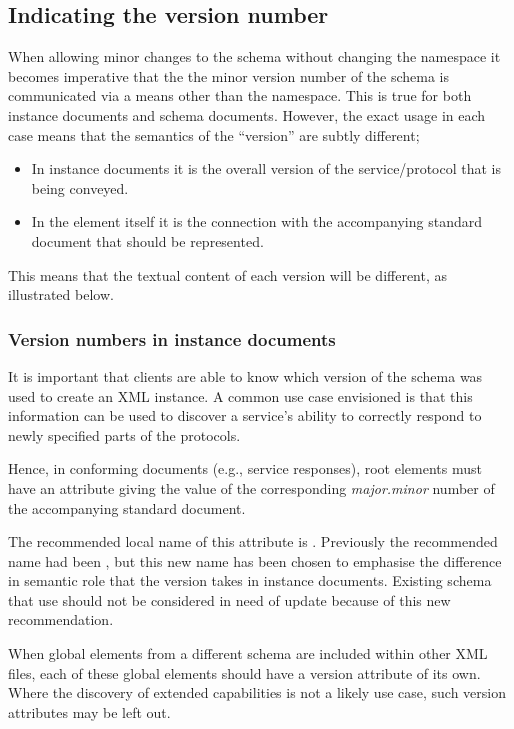 \documentclass[10pt,a4paper]{ivoa}
\begin{document}
\subsection{Indicating the version number}

When allowing minor changes to the schema without changing the
namespace it becomes imperative that the the minor version number of the schema
is communicated via a means other than the namespace.  This is true for
both instance documents and schema documents. However, the exact usage in each
case means that the semantics of the ``version'' are subtly different;
\begin{itemize}
  \item In instance documents it is the overall version of the service/protocol
  that is being conveyed.
  \item In the  element itself it is the connection with the
  accompanying standard document that should be represented.
\end{itemize}

This means that the textual content of each version will be different, as
illustrated below.

\subsubsection{Version numbers in instance documents}

It is important that
clients are able to know which version of the schema was used to create an XML
instance.  A common use case envisioned is that
this information can be used to discover a service's ability to
correctly respond to newly specified parts of the protocols.

Hence, in conforming documents (e.g., service responses),
root elements must have an
attribute giving the value of the corresponding \textit{major.minor} number of the
accompanying standard document.

The recommended local name of this attribute is
. Previously the recommended name had been ,
but this new name has been chosen to emphasise the difference in semantic role
that the version takes in instance documents. Existing schema that use
 should not be considered in need of update because of this new
recommendation.

When global elements from a different schema are included within other
XML files, each of these global elements should have a version attribute
of its own.  Where the discovery of extended capabilities is not a
likely use case, such version attributes may be left out.
\end{document}
